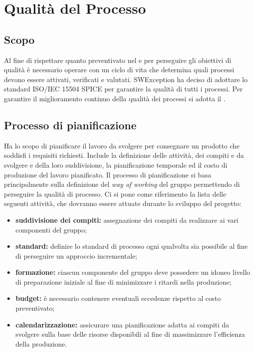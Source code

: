 \section{Qualità del Processo} \label{_qualitaProcesso}
\subsection{Scopo}
Al fine di rispettare quanto preventivato nel  e per perseguire gli obiettivi di qualità è necessario operare con un ciclo di vita che determina quali processi
devono essere attivati, verificati e valutati. SWException ha deciso di adottare lo standard ISO/IEC 15504 SPICE per garantire la qualità di tutti i processi.
Per garantire il miglioramento continuo della qualità dei processi si adotta il \textit{}.

\subsection{Processo di pianificazione}
Ha lo scopo di pianificare il lavoro da svolgere per consegnare un prodotto che soddisfi i requisiti richiesti. Include la definizione delle attività, dei compiti e da svolgere
e della loro suddivisione, la pianificazione temporale ed il costo di produzione del lavoro pianificato.
Il processo di pianificazione si basa principalmente sulla definizione del \textit{way of working} del gruppo permettendo di perseguire la qualità di processo.
Ci si pone come riferimento la lista delle seguenti attività, che dovranno essere attuate durante lo sviluppo del progetto:

\begin{itemize}
    \item \textbf{suddivisione dei compiti:} assegnazione dei compiti da realizzare ai vari componenti del gruppo;
    \item \textbf{standard:} definire lo standard di processo ogni qualvolta sia possibile al fine di perseguire un approccio incrementale;
    \item \textbf{formazione:} ciascun componente del gruppo deve possedere un idoneo  livello di preparazione iniziale al fine di minimizzare i ritardi nella produzione;
    \item \textbf{budget:} è necessario contenere eventuali eccedenze rispetto al costo preventivato;
    \item \textbf{calendarizzazione:} assicurare una pianificazione adatta ai compiti da svolgere sulla base delle risorse disponibili al fine di massimizzare l'efficienza della produzione.
\end{itemize}

